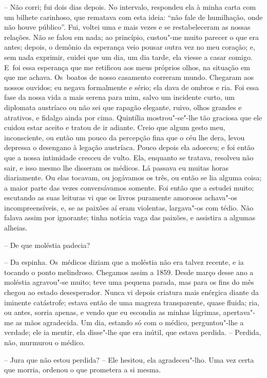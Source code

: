 -- Não corri; fui dois dias depois. No intervalo, respondeu ela à minha
carta com um bilhete carinhoso, que rematava com esta ideia: ``não fale
de humilhação, onde não houve público''. Fui, voltei uma e mais vezes e
se restabeleceram as nossas relações. Não se falou em nada; ao
princípio, custou"-me muito parecer o que era antes; depois, o demônio da
esperança veio pousar outra vez no meu coração; e, sem nada exprimir,
cuidei que um dia, um dia tarde, ela viesse a casar comigo. E~foi essa
esperança que me retificou aos meus próprios olhos, na situação em que
me achava. Os~boatos de nosso casamento correram mundo. Chegaram aos
nossos ouvidos; eu negava formalmente e sério; ela dava de ombros e ria.
Foi essa fase da nossa vida a mais serena para mim, salvo um incidente
curto, um diplomata austríaco ou não sei que rapagão elegante, ruivo,
olhos grandes e atrativos, e fidalgo ainda por cima. Quintília
mostrou"-se"-lhe tão graciosa que ele cuidou estar aceito e tratou de ir
adiante. Creio que algum gesto meu, inconsciente, ou então um pouco da
percepção fina que o céu lhe dera, levou depressa o desengano à legação
austríaca. Pouco depois ela adoeceu; e foi então que a nossa intimidade
cresceu de vulto. Ela, enquanto se tratava, resolveu não sair, e isso
mesmo lhe disseram os médicos. Lá passava eu muitas horas diariamente.
Ou elas tocavam, ou jogávamos os três, ou então se lia alguma coisa; a
maior parte das vezes conversávamos somente. Foi então que a estudei
muito; escutando as suas leituras vi que os livros puramente amorosos
achava"-os incompreensíveis, e, se as paixões aí eram violentas,
largava"-os com tédio. Não falava assim por ignorante; tinha notícia vaga
das paixões, e assistira a algumas alheias.

-- De que moléstia padecia?

-- Da espinha. Os~médicos diziam que a moléstia não era talvez recente,
e ia tocando o ponto melindroso. Chegamos assim a 1859. Desde março
desse ano a moléstia agravou"-se muito; teve uma pequena parada, mas para
os fins do mês chegou ao estado desesperador. Nunca vi depois criatura
mais enérgica diante da iminente catástrofe; estava então de uma magreza
transparente, quase fluida; ria, ou antes, sorria apenas, e vendo que eu
escondia as minhas lágrimas, apertava"-me as mãos agradecida. Um dia,
estando só com o médico, perguntou"-lhe a verdade; ele ia mentir, ela
disse"-lhe que era inútil, que estava perdida. -- Perdida, não, murmurou
o médico.

-- Jura que não estou perdida? -- Ele hesitou, ela agradeceu"-lho. Uma
vez certa que morria, ordenou o que prometera a si mesma.

